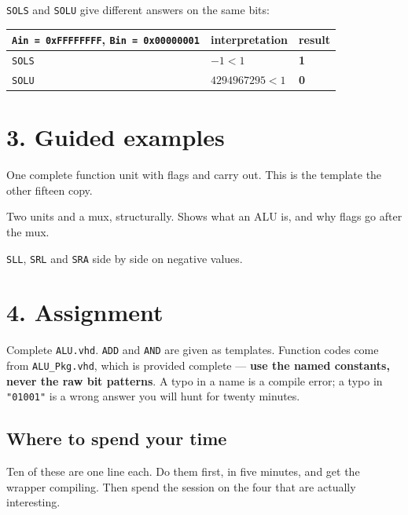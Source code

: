 \documentclass[11pt]{article}
\newcommand{\code}[1]{\texttt{#1}}
\begin{document}
\code{SOLS} and \code{SOLU} give different answers on the same bits:

\begin{center}
\begin{tabular}{lll}
\toprule
\code{Ain = 0xFFFFFFFF}, \code{Bin = 0x00000001} & interpretation & result \\
\midrule
\code{SOLS} & $-1 < 1$ & \textbf{1} \\
\code{SOLU} & $4294967295 < 1$ & \textbf{0} \\
\bottomrule
\end{tabular}
\end{center}

\section*{3. Guided examples}

\begin{description}[leftmargin=2.4em,style=nextline,itemsep=2pt]
\item[Example 1 --- \code{alu\_add}] One complete function unit with flags and
carry out. This is the template the other fifteen copy.
\item[Example 2 --- \code{alu\_mini}] Two units and a mux, structurally. Shows
what an ALU is, and why flags go after the mux.
\item[Example 3 --- \code{shift\_demo}] \code{SLL}, \code{SRL} and \code{SRA}
side by side on negative values.
\end{description}

\section*{4. Assignment}

Complete \code{ALU.vhd}. \code{ADD} and \code{AND} are given as templates.
Function codes come from \code{ALU\_Pkg.vhd}, which is provided complete ---
\textbf{use the named constants, never the raw bit patterns}. A typo in a name
is a compile error; a typo in \code{"01001"} is a wrong answer you will hunt for
twenty minutes.

\subsection*{Where to spend your time}

Ten of these are one line each. Do them first, in five minutes, and get the
wrapper compiling. Then spend the session on the four that are actually
interesting.
\end{document}
